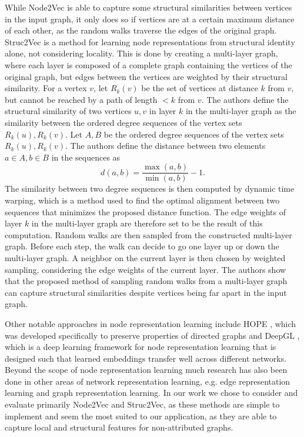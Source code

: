 \documentclass[draft,final]{vutinfth} %
\begin{document}
While Node2Vec is able to capture some structural similarities between vertices in the input graph, it only does so if vertices are at a certain maximum distance of each other, as the random walks traverse the edges of the original graph. Struc2Vec \cite{FigueiredoRS17} is a method for learning node representations from structural identity alone, not considering locality. 
This is done by creating a multi-layer graph, where each layer is composed of a complete graph containing the vertices of the original graph, but edges between the vertices are weighted by their structural similarity. 
For a vertex $v$, let $R_k(v)$ be the set of vertices at distance $k$ from $v$, but cannot be reached by a path of length $< k$ from $v$. 
The authors define the structural similarity of two vertices $u,v$ in layer $k$ in the multi-layer graph as the similarity between the ordered degree sequences of the vertex sets $R_k(u), R_k(v)$.
Let $A, B$ be the ordered degree sequences of the vertex sets $R_k(u), R_k(v)$. The authors define the distance between two elements $a \in A, b \in B$ in the sequences as 
\[
    d(a,b) = \frac{\max(a,b)}{\min(a,b) } - 1.
\]
The similarity between two degree sequences is then computed by dynamic time warping, which is a method used to find the optimal alignment between two sequences that minimizes the proposed distance function. The edge weights of layer $k$ in the multi-layer graph are therefore set to be the result of this computation. 
Random walks are then sampled from the constructed multi-layer graph. Before each step, the walk can decide to go one layer up or down the multi-layer graph. A neighbor on the current layer is then chosen by weighted sampling, considering the edge weights of the current layer. 
The authors show that the proposed method of sampling random walks from a multi-layer graph can capture structural similarities despite vertices being far apart in the input graph. 

Other notable approaches in node representation learning include HOPE \cite{Mingdong2016}, which was developed specifically to preserve properties of directed graphs and DeepGL \cite{Rossi17a}, which is a deep learning framework for node representation learning that is designed such that learned embeddings transfer well across different networks. Beyond the scope of node representation learning much research has also been done in other areas of network representation learning, e.g. edge representation learning and graph representation learning. In our work we chose to consider and evaluate primarily Node2Vec and Struc2Vec, as these methods are simple to implement and seem the most suited to our application, as they are able to capture local and structural features for non-attributed graphs. 
\end{document}
